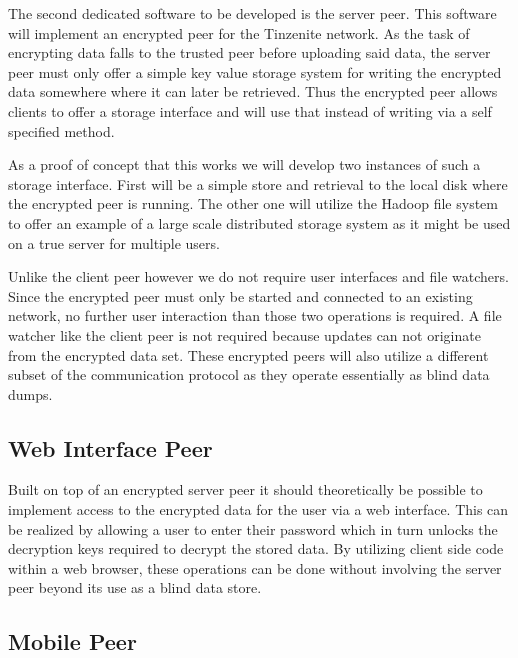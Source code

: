 The second dedicated software to be developed is the server peer.
This software will implement an encrypted peer for the Tinzenite network.
As the task of encrypting data falls to the trusted peer before uploading said data, the server peer must only offer a simple key value storage system for writing the encrypted data somewhere where it can later be retrieved.
Thus the encrypted peer allows clients to offer a storage interface and will use that instead of writing via a self specified method.

As a proof of concept that this works we will develop two instances of such a storage interface.
First will be a simple store and retrieval to the local disk where the encrypted peer is running.
The other one will utilize the Hadoop file system to offer an example of a large scale distributed storage system as it might be used on a true server for multiple users.

Unlike the client peer however we do not require user interfaces and file watchers.
Since the encrypted peer must only be started and connected to an existing network, no further user interaction than those two operations is required.
A file watcher like the client peer is not required because updates can not originate from the encrypted data set.
These encrypted peers will also utilize a different subset of the communication protocol as they operate essentially as blind data dumps.

\subsection{Web Interface Peer}

Built on top of an encrypted server peer it should theoretically be possible to implement access to the encrypted data for the user via a web interface.
This can be realized by allowing a user to enter their password which in turn unlocks the decryption keys required to decrypt the stored data.
By utilizing client side code within a web browser, these operations can be done without involving the server peer beyond its use as a blind data store.

\subsection{Mobile Peer}

